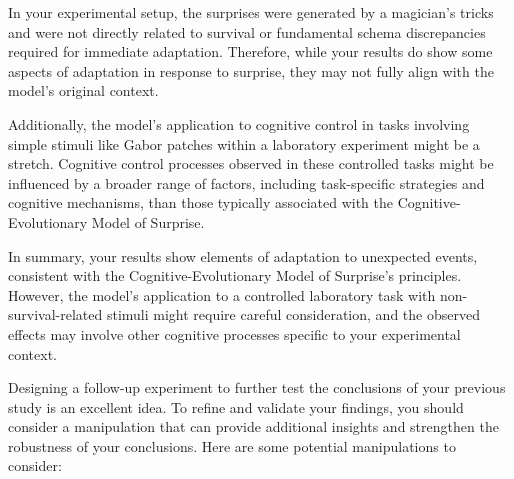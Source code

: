 \documentclass[
  man]{apa7}
\begin{document}
In your experimental setup, the surprises were generated by a magician's tricks and were not directly related to survival or fundamental schema discrepancies required for immediate adaptation. Therefore, while your results do show some aspects of adaptation in response to surprise, they may not fully align with the model's original context.

Additionally, the model's application to cognitive control in tasks involving simple stimuli like Gabor patches within a laboratory experiment might be a stretch. Cognitive control processes observed in these controlled tasks might be influenced by a broader range of factors, including task-specific strategies and cognitive mechanisms, than those typically associated with the Cognitive-Evolutionary Model of Surprise.

In summary, your results show elements of adaptation to unexpected events, consistent with the Cognitive-Evolutionary Model of Surprise's principles. However, the model's application to a controlled laboratory task with non-survival-related stimuli might require careful consideration, and the observed effects may involve other cognitive processes specific to your experimental context.

\newpage

Designing a follow-up experiment to further test the conclusions of your previous study is an excellent idea. To refine and validate your findings, you should consider a manipulation that can provide additional insights and strengthen the robustness of your conclusions. Here are some potential manipulations to consider:
\end{document}
